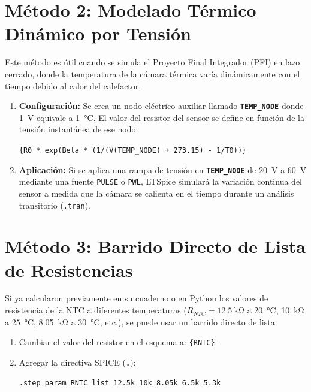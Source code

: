 \documentclass[11pt,a4paper]{article}
\newcommand{\tecla}[1]{\colorbox{gray!20}{\texttt{\footnotesize\textbf{#1}}}}
\newcommand{\spice}[1]{\texttt{\color{purple}#1}}
\begin{document}
\vspace{0.5cm}
\section{Método 2: Modelado Térmico Dinámico por Tensión}
Este método es útil cuando se simula el Proyecto Final Integrador (PFI) en lazo cerrado, donde la temperatura de la cámara térmica varía dinámicamente con el tiempo debido al calor del calefactor.

\begin{enumerate}
    \item \textbf{Configuración:} Se crea un nodo eléctrico auxiliar llamado \tecla{TEMP\_NODE} donde \qty{1}{\volt} equivale a \qty{1}{\celsius}. El valor del resistor del sensor se define en función de la tensión instantánea de ese nodo:
    \begin{center}
        \spice{\{R0 * exp(Beta * (1/(V(TEMP\_NODE) + 273.15) - 1/T0))\}}
    \end{center}
    \item \textbf{Aplicación:} Si se aplica una rampa de tensión en \tecla{TEMP\_NODE} de \qty{20}{\volt} a \qty{60}{\volt} mediante una fuente \texttt{PULSE} o \texttt{PWL}, LTSpice simulará la variación continua del sensor a medida que la cámara se calienta en el tiempo durante un análisis transitorio (\spice{.tran}).
\end{enumerate}

\section{Método 3: Barrido Directo de Lista de Resistencias}
Si ya calcularon previamente en su cuaderno o en Python los valores de resistencia de la NTC a diferentes temperaturas ($R_{NTC} = \qty{12.5}{\kilo\ohm}$ a \qty{20}{\celsius}, \qty{10}{\kilo\ohm} a \qty{25}{\celsius}, \qty{8.05}{\kilo\ohm} a \qty{30}{\celsius}, etc.), se puede usar un barrido directo de lista.

\begin{enumerate}
    \item Cambiar el valor del resistor en el esquema a: \spice{\{RNTC\}}.
    \item Agregar la directiva SPICE (\tecla{.}):
    \begin{lstlisting}
.step param RNTC list 12.5k 10k 8.05k 6.5k 5.3k
    \end{lstlisting}
\end{enumerate}
\end{document}
